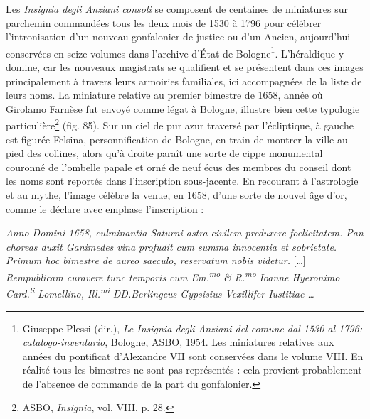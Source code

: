 \documentclass[12pt,twoside,openany]{book}
\renewenvironment{quote}
  {%
    \par\begingroup
    \fontsize{11pt}{14pt}\selectfont
    \list{}{\leftmargin=1.5em\rightmargin=1.5em}%
    \item\relax
  }
  {%
    \endlist
    \endgroup
  }
\newenvironment{PurhBlockQuote}
  {%
    \begin{quote}
  }
  {%
    \end{quote}
  }
\begin{document}
Les \textit{Insignia degli Anziani consoli} se composent de centaines de miniatures sur parchemin commandées tous les deux mois de 1530 à 1796 pour célébrer l’intronisation d’un nouveau gonfalonier de justice ou d’un Ancien, aujourd’hui conservées en seize volumes dans l’archive d’État de Bologne\footnote{Giuseppe Plessi (dir.), \textit{Le Insignia degli Anziani del comune dal 1530 al 1796: catalogo-inventario}, Bologne, ASBO, 1954. Les miniatures relatives aux années du pontificat d’Alexandre VII sont conservées dans le volume VIII. En réalité tous les bimestres ne sont pas représentés : cela provient probablement de l’absence de commande de la part du gonfalonier.}. L’héraldique y domine, car les nouveaux magistrats se qualifient et se présentent dans ces images principalement à travers leurs armoiries familiales, ici accompagnées de la liste de leurs noms. La miniature relative au premier bimestre de 1658, année où Girolamo Farnèse fut envoyé comme légat à Bologne, illustre bien cette typologie particulière\footnote{ASBO, \textit{Insignia}, vol. VIII, p. 28.} (fig. 85). Sur un ciel de pur azur traversé par l’écliptique, à gauche est figurée Felsina, personnification de Bologne, en train de montrer la ville au pied des collines, alors qu’à droite paraît une sorte de cippe monumental couronné de l’ombelle papale et orné de neuf écus des membres du conseil dont les noms sont reportés dans l’inscription sous-jacente. En recourant à l’astrologie et au mythe, l’image célèbre la venue, en 1658, d’une sorte de nouvel âge d’or, comme le déclare avec emphase l’inscription :

\begin{PurhBlockQuote}
\textit{Anno Domini 1658, culminantia Saturni astra civilem preduxere foelicitatem. Pan choreas duxit Ganimedes vina profudit cum summa innocentia et sobrietate. Primum hoc bimestre de aureo saeculo, reservatum nobis videtur. }[…]\textit{ Rempublicam curavere tunc temporis cum Em.}\textit{\textsuperscript{mo}}\textit{ \& R.}\textit{\textsuperscript{mo}}\textit{ Ioanne Hyeronimo Card.}\textit{\textsuperscript{li}}\textit{ Lomellino, Ill.}\textit{\textsuperscript{mi}}\textit{ DD.Berlingeus Gypsisius Vexillifer Iustitiae … }
\end{PurhBlockQuote}
\end{document}
